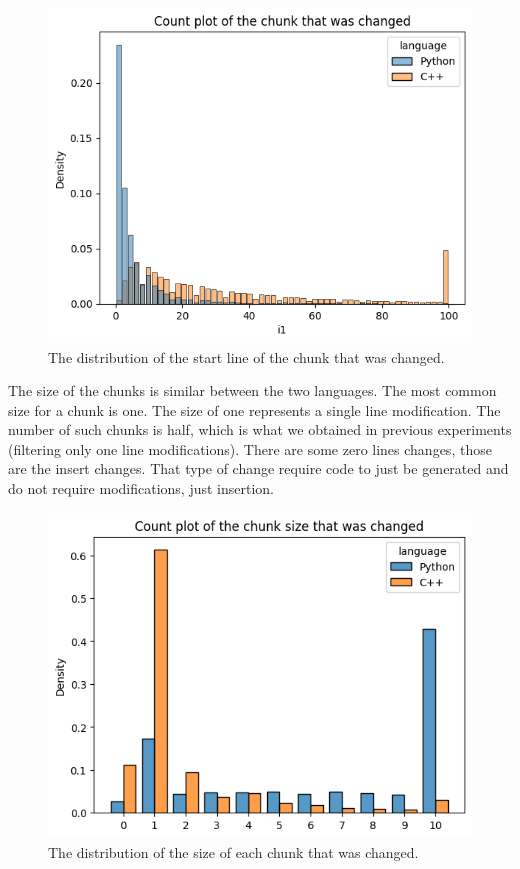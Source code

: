 \documentclass[12pt,a4paper]{report}
\begin{document}
\begin{figure}[hp!]
\centering
\includegraphics[width=\textwidth]{pics/submissionchunk.png}
  \caption{The distribution of the start line of the chunk that was changed.}
  \label{fig:dataseteda7}
\end{figure}

\newpage

The size of the chunks is similar between the two languages. The most common size for a chunk is one. The size of one represents a single line modification. The number of such chunks is half, which is what we obtained in previous experiments (filtering only one line modifications). There are some zero lines changes, those are the insert changes.  That type of change require code to just be generated and do not require modifications, just insertion.

\begin{figure}[hp!]
\centering
\includegraphics[width=\textwidth]{pics/submissionchunksize.png}
  \caption{The distribution of the size of each chunk that was changed.}
  \label{fig:dataseteda8}
\end{figure}
\end{document}
